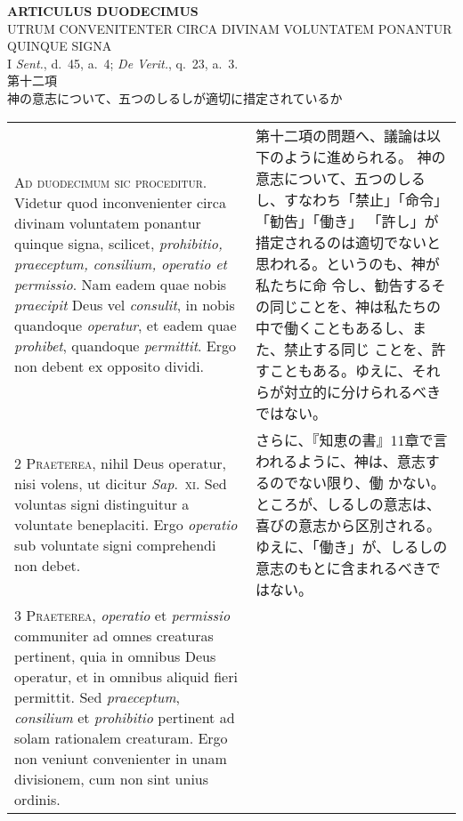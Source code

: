 \documentclass[10pt]{jsarticle} %
\begin{document}
\begin{center}
 {\Large {\bf ARTICULUS DUODECIMUS}}\\
 {\large UTRUM CONVENITENTER CIRCA DIVINAM VOLUNTATEM PONANTUR QUINQUE SIGNA}\\
 {\footnotesize I {\itshape Sent.}, d.~45, a.~4; {\itshape De Verit.},
 q.~23, a.~3.}\\
 {\Large 第十二項\\神の意志について、五つのしるしが適切に措定されているか}
\end{center}

\begin{longtable}{p{21em}p{21em}}


{\huge A}{\scshape d duodecimum sic proceditur}. Videtur quod
inconvenienter circa divinam voluntatem ponantur quinque signa,
scilicet, {\itshape prohibitio, praeceptum, consilium, operatio et permissio}. Nam
eadem quae nobis {\itshape praecipit} Deus vel {\itshape consulit}, in nobis quandoque
{\itshape operatur}, et eadem quae {\itshape prohibet}, quandoque {\itshape permittit}. Ergo non debent
ex opposito dividi.


&

第十二項の問題へ、議論は以下のように進められる。
神の意志について、五つのしるし、すなわち「禁止」「命令」「勧告」「働き」
 「許し」が措定されるのは適切でないと思われる。というのも、神が私たちに命
 令し、勧告するその同じことを、神は私たちの中で働くこともあるし、また、禁止する同じ
 ことを、許すこともある。ゆえに、それらが対立的に分けられるべきではない。


\\


{\scshape 2 Praeterea}, nihil Deus operatur, nisi
volens, ut dicitur {\itshape Sap}.~{\scshape xi}. Sed voluntas signi distinguitur a voluntate
beneplaciti. Ergo {\itshape operatio} sub voluntate signi comprehendi non debet.


&


さらに、『知恵の書』11章で言われるように、神は、意志するのでない限り、働
 かない。ところが、しるしの意志は、喜びの意志から区別される。
ゆえに、「働き」が、しるしの意志のもとに含まれるべきではない。

\\


{\scshape 3 Praeterea}, {\itshape operatio} et {\itshape permissio}
communiter ad omnes creaturas pertinent, quia in omnibus Deus operatur,
et in omnibus aliquid fieri permittit. Sed {\itshape praeceptum}, {\itshape consilium} et
{\itshape prohibitio} pertinent ad solam rationalem creaturam. Ergo non veniunt
convenienter in unam divisionem, cum non sint unius ordinis.



\end{longtable}
\end{document}
